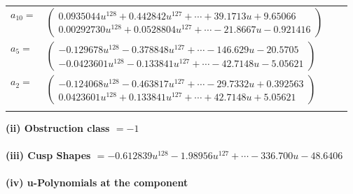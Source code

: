 \documentclass[1p]{elsarticle_modified}
\theoremstyle{definition}
\begin{document}
\begin{tabular}{m{7pt} m{180pt} m{7pt} m{180pt} }
\flushright $a_{10}=$&$\begin{pmatrix}0.0935044 u^{128}+0.442842 u^{127}+\cdots+39.1713 u+9.65066\\0.00292730 u^{128}+0.0528804 u^{127}+\cdots-21.8667 u-0.921416\end{pmatrix}$ \\
\flushright $a_{5}=$&$\begin{pmatrix}-0.129678 u^{128}-0.378848 u^{127}+\cdots-146.629 u-20.5705\\-0.0423601 u^{128}-0.133841 u^{127}+\cdots-42.7148 u-5.05621\end{pmatrix}$ \\
\flushright $a_{2}=$&$\begin{pmatrix}-0.124068 u^{128}-0.463817 u^{127}+\cdots-29.7332 u+0.392563\\0.0423601 u^{128}+0.133841 u^{127}+\cdots+42.7148 u+5.05621\end{pmatrix}$\\&\end{tabular}
\flushleft \textbf{(ii) Obstruction class $= -1$}\\~\\
\flushleft \textbf{(iii) Cusp Shapes $= -0.612839 u^{128}-1.98956 u^{127}+\cdots-336.700 u-48.6406$}\\~\\
\newpage\renewcommand{\arraystretch}{1}
\flushleft \textbf{(iv) u-Polynomials at the component}\newline \\
\end{document}
